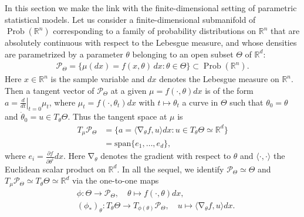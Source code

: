 \documentclass[11pt]{amsart}
\theoremstyle{definition}
\DeclareMathOperator{\grad}{\nabla}
\newcommand{\R}{\mathbb R}
\newcommand{\ProbRn}{\operatorname{Prob}(\R^n)}
\begin{document}
In this section we make the link with the finite-dimensional setting of parametric statistical models. Let us consider a finite-dimensional submanifold of $\ProbRn$ corresponding to a family of probability distributions on $\R^n$ that are absolutely continuous with respect to the Lebesgue measure, and whose densities are parametrized by a parameter $\theta$ belonging to an open subset $\Theta$ of $\R^d$:
\begin{align*}
    \mathcal P_\Theta = \{\mu(dx)=f(x,\theta)\,dx: \theta\in\Theta\}\subset \ProbRn.
\end{align*}
Here $x\in\R^n$ is the sample variable and $dx$ denotes the Lebesgue measure on $\R^n$. Then a tangent vector of $\mathcal P_\Theta$ at a given $\mu=f(\cdot,\theta) dx$ is of the form $a=\left.\frac{d}{dt}\right|_{t=0}\mu_t$, where $\mu_t=f(\cdot,\theta_t)dx$ with $t\mapsto\theta_t$ a curve in $\Theta$ such that $\theta_0=\theta$ and $\dot\theta_0=
u\in T_\theta\Theta$. %
Thus the tangent space at $\mu$ is
\begin{align}\label{basis-vectors}
T_\mu\mathcal P_\Theta&=\{a= \langle\grad_\theta f, u\rangle dx : u\in T_\theta\Theta \simeq \R^d\}\nonumber\\
&=\mathrm{span}\{e_1,\hdots,e_d\},
\end{align}
where $e_i=\frac{\partial f}{\partial\theta^i}dx$. 
Here $\grad_\theta$ denotes the gradient with respect to $\theta$ and $\langle\cdot,\cdot\rangle$ the Euclidean scalar product on $\R^d$. In all the sequel, we identify $\mathcal P_\Theta \simeq \Theta$ and $T_\mu\mathcal P_\Theta \simeq T_\theta \Theta \simeq \R^d$ via the one-to-one maps
\begin{equation}\label{bij}
\begin{aligned}
&\phi: \Theta \rightarrow \mathcal P_\Theta, \quad \theta \mapsto f(\cdot,\theta)dx,\\
&(\phi_*)_\theta: T_\theta\Theta\rightarrow T_{\phi(\theta)}\mathcal P_\Theta, \quad u \mapsto \langle \grad_\theta f,u\rangle dx.
\end{aligned}
\end{equation}
\end{document}
